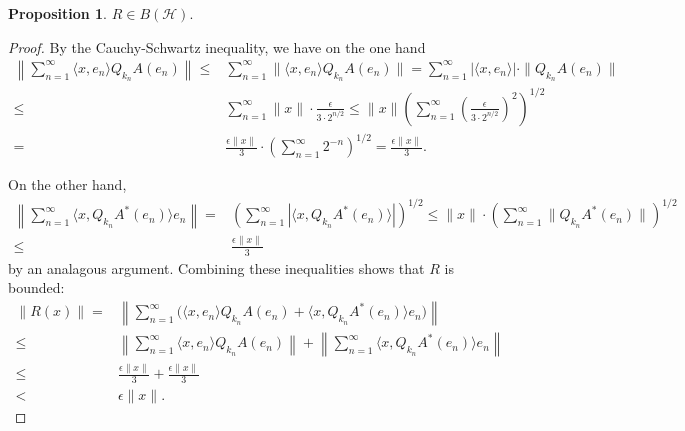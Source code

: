 \documentclass{dcthesis}
\numberwithin{equation}{section}
\numberwithin{equation}{section}
\theoremstyle{definition}
\newtheorem{proposition}[equation]{Proposition}
\begin{document}
\begin{proposition}
\label{prop_r_bh}
	$R\in B(\mathcal{H})$.
\end{proposition}
\begin{proof}
	By the Cauchy-Schwartz inequality, we have on the one hand
	\begin{align*}
		\left\| \sum_{n=1}^\infty \langle x, e_n \rangle Q_{k_n}A(e_n) \right\| \leq&
		\sum_{n=1}^\infty \| \langle x, e_n \rangle Q_{k_n}A(e_n) \| 
		= \sum_{n=1}^\infty | \langle x, e_n \rangle | \cdot \|Q_{k_n}A(e_n)\| \\
		\leq& \sum_{n=1}^\infty \|x\| \cdot \frac{\epsilon}{3\cdot 2^{n/2}} 
		\leq \|x\| \left( \sum_{n=1}^\infty \left( \frac{\epsilon}{3\cdot 2^{n/2}} \right)^2 \right)^{1/2} \\
		=& \frac{\epsilon \|x\|}{3} \cdot \left( \sum_{n=1}^\infty 2^{-n} \right)^{1/2} 
		= \frac{\epsilon \|x\|}{3}.
	\end{align*}

	On the other hand,
	\begin{align*}
		\left\| \sum_{n=1}^\infty \langle x, Q_{k_n}A^\ast(e_n) \rangle e_n \right\| 
		=& \left( \sum_{n=1}^\infty |\langle x, Q_{k_n}A^\ast(e_n) \rangle | \right)^{1/2} 
		\leq \|x\| \cdot \left( \sum_{n=1}^\infty \| Q_{k_n}A^\ast(e_n) \| \right)^{1/2} \\
		\leq& \frac{\epsilon \|x\|}{3}
	\end{align*}
	by an analagous argument. Combining these inequalities shows that $R$ is bounded:
	\begin{align*}
		\|R(x)\|  
		=& \left\| \sum_{n=1}^\infty \Big( \langle x, e_n \rangle Q_{k_n}A(e_n) + \langle x, Q_{k_n}A^\ast(e_n) \rangle e_n \Big) \right\| \\
		\leq& \left\| \sum_{n=1}^\infty \langle x, e_n \rangle Q_{k_n}A(e_n) \right\| + 	\left\| \sum_{n=1}^\infty \langle x, Q_{k_n}A^\ast(e_n) \rangle e_n \right\| \\
		\leq& \frac{\epsilon \|x\|}{3} + \frac{\epsilon \|x\|}{3} \\
		<& \epsilon \|x\|.
	\end{align*}
\end{proof}
\end{document}
